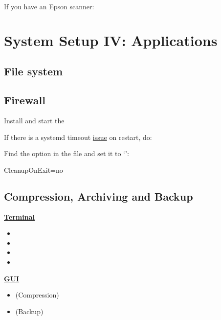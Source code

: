 \vspace*{1em}
If you have an Epson scanner:


\section{System Setup IV: Applications}

\subsection{File system}


\subsection{Firewall}

Install  and start the 

If there is a systemd timeout \href{https://bugzilla.redhat.com/show_bug.cgi?id=1294415#c10}{issue} on restart, do:

\begin{blocksection}
	Find the  option in the file and set it to `':
	\vspace*{1em}
	\begin{codeblock}
		CleanupOnExit=no
	\end{codeblock}
\end{blocksection}

\subsection{Compression, Archiving and Backup}

\begin{varwidth}[t]{.5\textwidth}
\textbf{\textcolor{textgrey}{\uline{Terminal}}}
	\begin{itemize}[noitemsep,topsep=0pt,leftmargin=*]
		\item {}
		\item {}
		\item {}
		\item {}
	\end{itemize}
\end{varwidth}
\hspace{4em}
\begin{varwidth}[t]{.5\textwidth}
	\textbf{\textcolor{textgrey}{\uline{GUI}}}
	\begin{itemize}[noitemsep,topsep=0pt,leftmargin=*]
		\item {} (Compression)
		\item {} (Backup)
	\end{itemize}
\end{varwidth}

